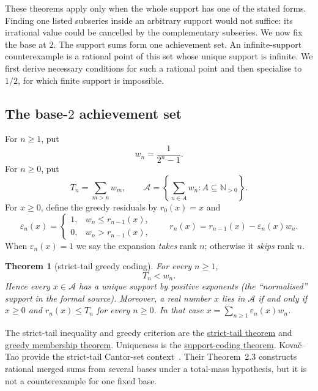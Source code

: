 \documentclass[11pt]{article}
\newcommand{\commit}{bb4e24651b37cd096d3749ef299c3317930b3a3b}
\newcommand{\repobase}{https://github.com/wcook04/plectis-lean-erdos249-257/blob/\commit}
\newcommand{\PK}{Erdos249257}
\newcommand{\lword}[4]{\href{\repobase/\PK/#1\#L#2}{#4}}
\newtheorem{theorem}{Theorem}[section]
\theoremstyle{definition}
\theoremstyle{remark}
\newcommand{\Npos}{\mathbb{N}_{>0}}
\begin{document}
These theorems apply only when the whole support has one of the stated forms.
Finding one listed subseries inside an arbitrary support would not suffice:
its irrational value could be cancelled by the complementary subseries.  We
now fix the base at \(2\).  The support sums form one achievement set.  An
infinite-support counterexample is a rational point of this set whose unique
support is infinite.  We first derive necessary conditions for such a rational point and
then specialise to \(1/2\), for which finite support is impossible.

\subsection{The base-$2$ achievement set}

For \(n\geq1\), put
\[
 w_n=\frac1{2^n-1}.
\]
For \(n\geq0\), put
\[
 T_n=\sum_{m>n}w_m,
 \qquad
 \mathcal A=\left\{\sum_{n\in A}w_n:A\subseteq\Npos\right\}.
\]
For \(x\geq0\), define the greedy residuals by \(r_0(x)=x\) and
\[
 \varepsilon_n(x)=
 \begin{cases}
  1,&w_n\leq r_{n-1}(x),\\
  0,&w_n>r_{n-1}(x),
 \end{cases}
 \qquad
 r_n(x)=r_{n-1}(x)-\varepsilon_n(x)w_n.
\]
When \(\varepsilon_n(x)=1\) we say the expansion \emph{takes} rank \(n\);
otherwise it \emph{skips} rank \(n\).

\begin{theorem}[strict-tail greedy coding]\label{res:greedy}
For every \(n\geq1\),
\[
 T_n<w_n.
\]
Hence every \(x\in\mathcal A\)
has a unique support by positive exponents (the ``normalised'' support in the
formal source).
Moreover, a real number \(x\) lies in \(\mathcal A\) if and only if \(x\geq0\)
and \(r_n(x)\leq T_n\) for every \(n\geq0\).  In that case
\(x=\sum_{n\geq1}\varepsilon_n(x)w_n\).
\end{theorem}
\noindent The strict-tail inequality and greedy criterion are the
\lword{GreedyAchievementSet.lean}{180}{mersenneTail_lt_weight}{strict-tail theorem}
and
\lword{GreedyAchievementSet.lean}{1458}{mem_mersenneAchievementSet_iff_greedy_survival}{greedy membership theorem}.
Uniqueness is the
\lword{GreedyAchievementSet.lean}{1563}{positiveMersenneSupportValue_injective_normalized}{support-coding theorem}.
Kova\v{c}--Tao provide the strict-tail Cantor-set
context~\cite[Remark~4.1, p.~13]{kovactao}.  Their Theorem~2.3
\cite[p.~5; proof pp.~13--14]{kovactao} constructs rational merged sums from
several bases under a total-mass hypothesis, but it is not a counterexample
for one fixed base.
\end{document}
